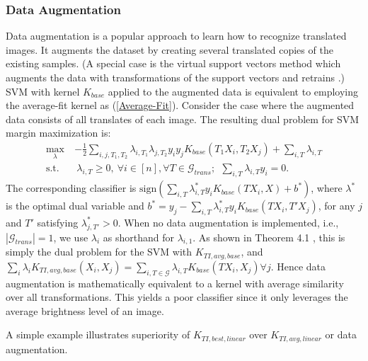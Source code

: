 \documentclass{article}
\theoremstyle{plain}
\theoremstyle{definition}
\theoremstyle{remark}
\begin{document}
\subsubsection{Data Augmentation}
Data augmentation is a popular approach to learn how to recognize translated images. It augments the dataset by creating several translated copies of the existing samples. (A special case is the virtual support vectors method which augments the data with transformations of the support vectors and retrains \cite{scholkopf2002learning}.) SVM with kernel $K_{base}$ applied to the augmented data is equivalent to employing the average-fit kernel as (\ref{Average-Fit}). Consider the case where the augmented data consists of all translates of each image. The resulting dual problem for SVM margin maximization
 \cite{cortes1995support} is: 
\begin{align*}
    \max_{\lambda} \ & -\frac{1}{2} \sum_{i, j, T_1, T_2} \lambda_{i, T_1} \lambda_{j, T_2} y_i y_j K_{base}(T_1 X_{i}, T_2 X_{j}) + \sum_{i, T} \lambda_{i, T} \\
    \text{s.t.} \ & \ \lambda_{i, T} \ge 0, \ \forall i \in [n], \forall T \in \mathcal{G}_{trans}; \ \ \sum_{i, T} \lambda_{i, T} y_i = 0.
\end{align*}
The corresponding classifier is $\text{sign}(\sum_{i, T} \lambda_{i, T}^* y_i K_{base}(T X_{i}, X) + b^*)$, where $\lambda^*$ is the optimal dual variable and $b^* = y_j - \sum_{i, T} \lambda_{i, T}^* y_i K_{base}(T X_{i}, T' X_{j})$, for any $j$ and $T'$ satisfying $\lambda_{j, T'}^* > 0$. When no data augmentation is implemented, i.e., $|\mathcal{G}_{trans}| = 1$, we use $\lambda_i$ as shorthand for $\lambda_{i, 1}$. As shown in Theorem 4.1 \cite{li2019enhanced}, this is simply the dual problem for the SVM with $K_{TI,avg,base}$, and $\sum_i \lambda_i K_{TI,avg,base}(X_i,X_j) = \sum_{i, T \in \mathcal{G}} \lambda_{i, T} K_{base}(T X_i, X_j) \forall j$.
Hence data augmentation is mathematically equivalent to a kernel with average similarity over all transformations. This yields a poor classifier since it only leverages the average brightness level of an image. 

A simple example illustrates superiority of $K_{TI,best,linear}$ over $K_{TI,avg,linear}$ or data augmentation.
\end{document}
